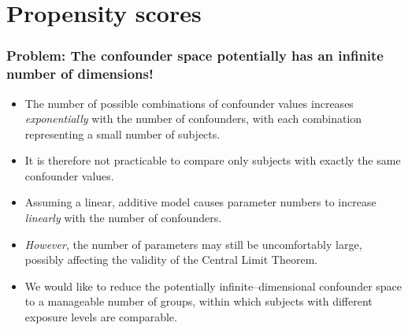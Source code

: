 \documentclass[11pt]{beamer}
\begin{document}
\section{Propensity scores}

\begin{frame}
\frametitle{Problem: The confounder space potentially has an infinite number of dimensions!}

\begin{itemize}

\item<2-> The number of possible combinations of confounder values increases \textit{exponentially} with the number of confounders,
with each combination representing a small number of subjects.

\item<3-> It is therefore not practicable to compare only subjects with exactly the same confounder values.

\item<4-> Assuming a linear, additive model causes parameter numbers to increase \textit{linearly} with the number of confounders.

\item<5-> \textit{However}, the number of parameters may still be uncomfortably large,
possibly affecting the validity of the Central Limit Theorem.

\item<6-> We would like to reduce the potentially infinite--dimensional confounder space to a manageable number of groups,
within which subjects with different exposure levels are comparable.

\end{itemize}

\end{frame}
\end{document}
